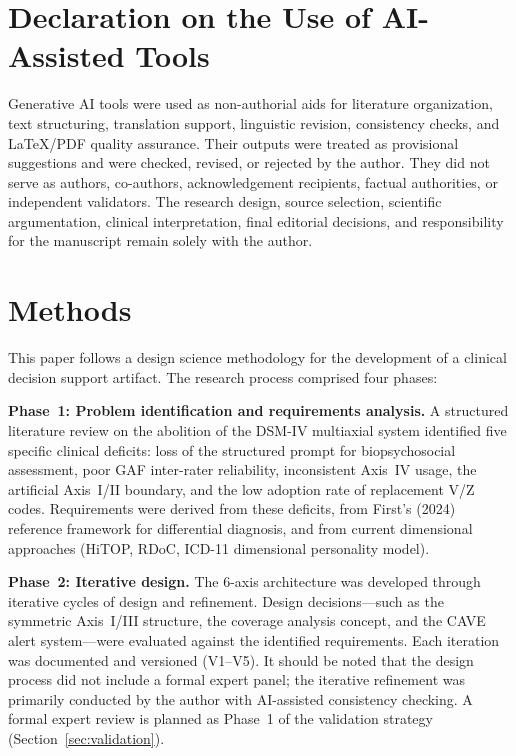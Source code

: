 \documentclass[11pt,a4paper]{article}
\begin{document}
\newpage
\begingroup
\footnotesize
{}
\setlength{\parskip}{0pt}
\tableofcontents
\endgroup

\section*{Declaration on the Use of AI-Assisted Tools}

Generative AI tools were used as non-authorial aids for literature organization, text structuring, translation support, linguistic revision, consistency checks, and LaTeX/PDF quality assurance. Their outputs were treated as provisional suggestions and were checked, revised, or rejected by the author. They did not serve as authors, co-authors, acknowledgement recipients, factual authorities, or independent validators. The research design, source selection, scientific argumentation, clinical interpretation, final editorial decisions, and responsibility for the manuscript remain solely with the author.

\newpage

\section{Methods}

This paper follows a design science methodology for the development of a clinical decision support artifact. The research process comprised four phases:

\textbf{Phase~1: Problem identification and requirements analysis.} A structured literature review on the abolition of the DSM-IV multiaxial system identified five specific clinical deficits: loss of the structured prompt for biopsychosocial assessment, poor GAF inter-rater reliability, inconsistent Axis~IV usage, the artificial Axis~I/II boundary, and the low adoption rate of replacement V/Z codes. Requirements were derived from these deficits, from First's (2024) reference framework for differential diagnosis, and from current dimensional approaches (HiTOP, RDoC, ICD-11 dimensional personality model).

\textbf{Phase~2: Iterative design.} The 6-axis architecture was developed through iterative cycles of design and refinement. Design decisions---such as the symmetric Axis~I/III structure, the coverage analysis concept, and the CAVE alert system---were evaluated against the identified requirements. Each iteration was documented and versioned (V1--V5). It should be noted that the design process did not include a formal expert panel; the iterative refinement was primarily conducted by the author with AI-assisted consistency checking. A formal expert review is planned as Phase~1 of the validation strategy (Section~\ref{sec:validation}).
\end{document}
